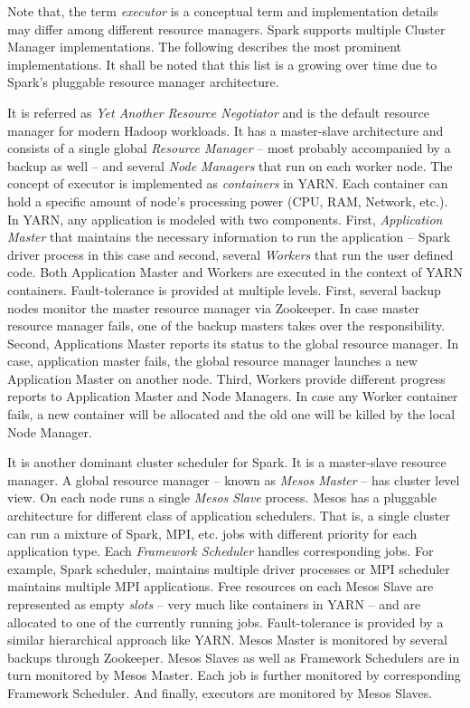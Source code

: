 Note that, the term \emph{executor} is a conceptual term and implementation details may differ among different resource managers. Spark supports multiple Cluster Manager implementations. The following describes the most prominent implementations. It shall be noted that this list is a growing over time due to Spark's pluggable resource manager architecture.
\begin{description}[leftmargin=0pt]
    \item [Apache YARN~\cite{Vavilapalli:2013}] It is referred as \emph{Yet Another Resource Negotiator} and is the default resource manager for modern Hadoop workloads. It has a master-slave architecture and consists of a single global \emph{Resource Manager} -- most probably accompanied by a backup as well --  and several \emph{Node Managers} that run on each worker node. The concept of executor is implemented as \emph{containers} in YARN. Each container can hold a specific amount of node's processing power (CPU, RAM, Network, etc.). In YARN, any application is modeled with two components. First, \emph{Application Master} that maintains the necessary information to run the application -- Spark driver process in this case and second, several \emph{Workers} that run the user defined code. Both Application Master and Workers are executed in the context of YARN containers. Fault-tolerance is provided at multiple levels. First, several backup nodes monitor the master resource manager via Zookeeper. In case master resource manager fails, one of the backup masters takes over the responsibility. Second, Applications Master reports its status to the global resource manager. In case, application master fails, the global resource manager launches a new Application Master on another node. Third, Workers provide different progress reports to Application Master and Node Managers. In case any Worker container fails, a new container will be allocated and the old one will be killed by the local Node Manager.
    \item [Apache Mesos~\cite{Hindman:2011}] It is another dominant cluster scheduler for Spark. It is a master-slave resource manager. A global resource manager -- known as \emph{Mesos Master} -- has cluster level view. On each node runs a single \emph{Mesos Slave} process. Mesos has a pluggable architecture for different class of application schedulers. That is, a single cluster can run a mixture of Spark, MPI, etc. jobs with different priority for each application type. Each \emph{Framework Scheduler} handles corresponding jobs. For example, Spark scheduler, maintains multiple driver processes or MPI scheduler maintains multiple MPI applications. Free resources on each Mesos Slave are represented as empty \emph{slots} -- very much like containers in YARN -- and are allocated to one of the currently running jobs. Fault-tolerance is provided by a similar hierarchical approach like YARN. Mesos Master is monitored by several backups through Zookeeper. Mesos Slaves as well as Framework Schedulers are in turn monitored by Mesos Master. Each job is further monitored by corresponding Framework Scheduler. And finally, executors are monitored by Mesos Slaves. 

\end{description}
